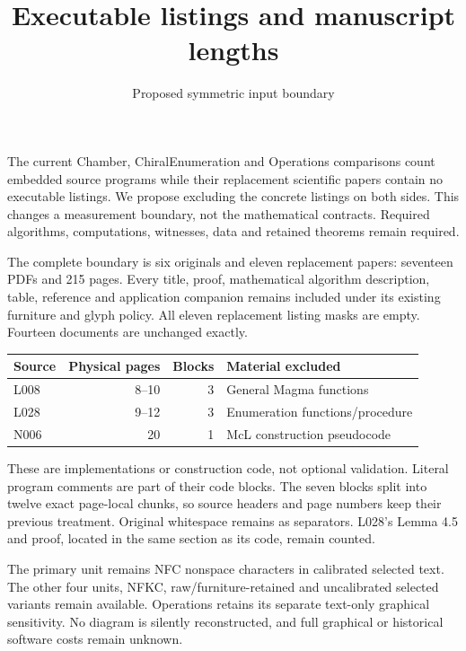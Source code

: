 \documentclass[11pt,a4paper]{article}
\title{Executable listings and manuscript lengths}
\author{Proposed symmetric input boundary}\date{}
\begin{document}
\maketitle
The current Chamber, ChiralEnumeration and Operations comparisons count embedded source programs while their replacement scientific papers contain no executable listings. We propose excluding the concrete listings on both sides. This changes a measurement boundary, not the mathematical contracts. Required algorithms, computations, witnesses, data and retained theorems remain required.

The complete boundary is six originals and eleven replacement papers: seventeen PDFs and 215 pages. Every title, proof, mathematical algorithm description, table, reference and application companion remains included under its existing furniture and glyph policy. All eleven replacement listing masks are empty. Fourteen documents are unchanged exactly.

\begin{center}\begin{tabular}{lrrl}\toprule
Source & Physical pages & Blocks & Material excluded\\\midrule
L008 & 8--10 & 3 & General Magma functions\\
L028 & 9--12 & 3 & Enumeration functions/procedure\\
N006 & 20 & 1 & McL construction pseudocode\\\bottomrule\end{tabular}\end{center}

These are implementations or construction code, not optional validation. Literal program comments are part of their code blocks. The seven blocks split into twelve exact page-local chunks, so source headers and page numbers keep their previous treatment. Original whitespace remains as separators. L028's Lemma 4.5 and proof, located in the same section as its code, remain counted.

The primary unit remains NFC nonspace characters in calibrated selected text. The other four units, NFKC, raw/furniture-retained and uncalibrated selected variants remain available. Operations retains its separate text-only graphical sensitivity. No diagram is silently reconstructed, and full graphical or historical software costs remain unknown.
\end{document}
